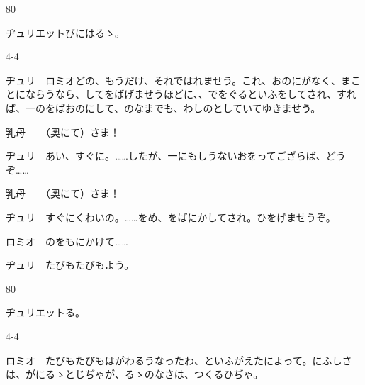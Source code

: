 \documentclass[tate,paper=b6j,jafontsize=9pt]{jlreq}
\begin{document}
\begin{azconvIndented}{8\zw}{0\zw}

ヂュリエットびにはるゝ。

\end{azconvIndented}
\begin{azconvIndented}{4\zw}{-4\zw}

ヂュリ　ロミオどの、もうだけ、それではれませう。これ、おのにがなく、まことにならうなら、してをばげませうほどに、、でをぐるといふをしてされ、すれば、一のをばおのにして、のなまでも、わしのとしていてゆきませう。

乳母　　（奧にて）さま！

ヂュリ　あい、すぐに。……したが、一にもしうないおをってござらば、どうぞ……

乳母　　（奧にて）さま！

ヂュリ　すぐにくわいの。……をめ、をばにかしてされ。ひをげませうぞ。

ロミオ　のをもにかけて……

ヂュリ　たびもたびもよう。

\end{azconvIndented}
\begin{azconvIndented}{8\zw}{0\zw}

ヂュリエットる。

\end{azconvIndented}
\begin{azconvIndented}{4\zw}{-4\zw}

ロミオ　たびもたびもはがわるうなったわ、といふがえたによって。にふしさは、がにるゝとじぢゃが、るゝのなさは、つくるひぢゃ。

\end{azconvIndented}
\end{document}
